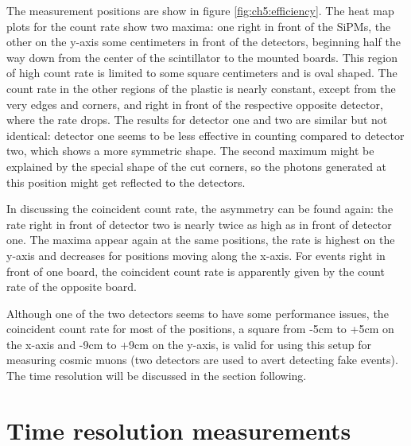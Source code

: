 The measurement positions are show in figure \ref{fig:ch5:efficiency}. The heat map plots for the count rate show two maxima: one right in front of the SiPMs, the other on the y-axis some centimeters in front of the detectors, beginning half the way down from the center of the scintillator to the mounted boards. This region of high count rate is limited to some square centimeters and is oval shaped. The count rate in the other regions of the plastic is nearly constant, except from the very edges and corners, and right in front of the respective opposite detector, where the rate drops. The results for detector one and two are similar but not identical: detector one seems to be less effective in counting compared to detector two, which shows a more symmetric shape. The second maximum might be explained by the special shape of the cut corners, so the photons generated at this position might get reflected to the detectors. \par 
In discussing the coincident count rate, the asymmetry can be found again: the rate right in front of detector two is nearly twice as high as in front of detector one. The maxima appear again at the same positions, the rate is highest on the y-axis and decreases for positions moving along the x-axis. For events right in front of one board, the coincident count rate is apparently given by the count rate of the opposite board. \par 
Although one of the two detectors seems to have some performance issues, the coincident count rate for most of the positions, a square from -5$\si{\centi\meter}$ to +5$\si{\centi\meter}$ on the x-axis and -9$\si{\centi\meter}$ to +9$\si{\centi\meter}$ on the y-axis, is valid for using this setup for measuring cosmic muons (two detectors are used to avert detecting fake events). The time resolution will be discussed in the section following.

\section{Time resolution measurements}

